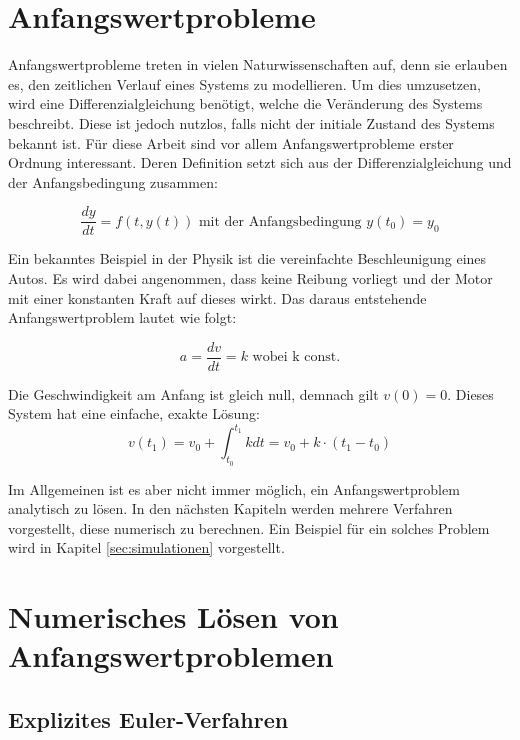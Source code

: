 
\section{Anfangswertprobleme} \label{sec:anfangswert_probleme}

Anfangswertprobleme treten in vielen Naturwissenschaften auf, denn sie erlauben es, 
den zeitlichen Verlauf eines Systems zu modellieren.
Um dies umzusetzen, wird eine Differenzialgleichung benötigt, welche die Veränderung des Systems beschreibt.
Diese ist jedoch nutzlos, falls nicht der initiale Zustand des Systems bekannt ist.
Für diese Arbeit sind vor allem Anfangswertprobleme erster Ordnung interessant.
Deren Definition setzt sich aus der Differenzialgleichung und der Anfangsbedingung zusammen:

$$
\frac{dy}{dt} = f(t, y(t)) \text{ mit der Anfangsbedingung } y(t_0) = y_0
$$

Ein bekanntes Beispiel in der Physik ist die vereinfachte Beschleunigung eines Autos.
Es wird dabei angenommen, dass keine Reibung vorliegt und der Motor mit einer konstanten Kraft auf dieses wirkt.
Das daraus entstehende Anfangswertproblem lautet wie folgt:

$$
a = \frac{dv}{dt} = k \text{ wobei k const.}
$$

Die Geschwindigkeit am Anfang ist gleich null, demnach gilt  $v(0) = 0$.
Dieses System hat eine einfache, exakte Lösung:
$$
v(t_1) = v_0 + \int_{t_0}^{t_1} k dt = v_0 + k \cdot (t_1 - t_0) 
$$

Im Allgemeinen ist es aber nicht immer möglich, 
ein Anfangswertproblem analytisch zu lösen. 
In den nächsten Kapiteln werden mehrere Verfahren vorgestellt, diese numerisch zu berechnen.
Ein Beispiel für ein solches Problem wird in Kapitel \ref{sec:simulationen} vorgestellt.

\section{Numerisches Lösen von Anfangswertproblemen} \label{sec:numerisches_lösen_von_anfangswert_problemen}

\subsection{Explizites Euler-Verfahren} \label{sec:explizites_euler_verfahren}

